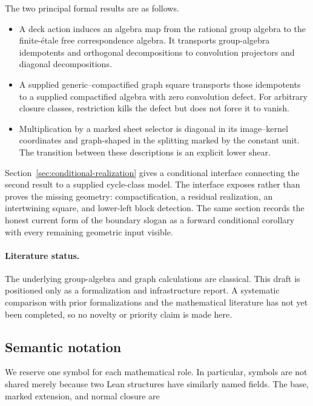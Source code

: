 \documentclass[11pt]{article}
\theoremstyle{definition}
\theoremstyle{remark}
\begin{document}
The two principal formal results are as follows.

\begin{itemize}[leftmargin=2.2em]
  \item A deck action induces an algebra map from the rational group algebra
        to the finite-\'etale free correspondence algebra.  It transports
        group-algebra idempotents and orthogonal decompositions to
        convolution projectors and diagonal decompositions.
  \item A supplied generic--compactified graph square transports those
        idempotents to a supplied compactified algebra with zero convolution
        defect.  For arbitrary closure classes, restriction kills the defect
        but does not force it to vanish.
  \item Multiplication by a marked sheet selector is diagonal in its
        image--kernel coordinates and graph-shaped in the splitting marked
        by the constant unit.  The transition between these descriptions is
        an explicit lower shear.
\end{itemize}

Section~\ref{sec:conditional-realization} gives a conditional interface
connecting the second result to a supplied cycle-class model.  The interface
exposes rather than proves the missing geometry: compactification, a residual
realization, an intertwining square, and lower-left block detection.
The same section records the honest current form of the boundary slogan as a
forward conditional corollary with every remaining geometric input visible.

\paragraph{Literature status.}
The underlying group-algebra and graph calculations are classical.  This
draft is positioned only as a formalization and infrastructure report.  A
systematic comparison with prior formalizations and the mathematical
literature has not yet been completed, so no novelty or priority claim is
made here.

\subsection*{Semantic notation}

We reserve one symbol for each mathematical role.  In particular, symbols
are not shared merely because two Lean structures have similarly named
fields.  The base, marked extension, and normal closure are
\end{document}
